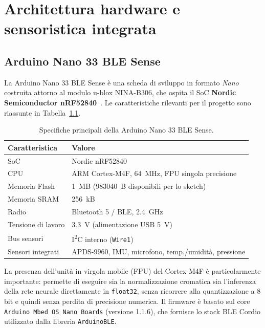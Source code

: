 \documentclass[11pt,a4paper,twoside,openany]{report}
\begin{document}
\chapter{Architettura hardware e sensoristica integrata}
\label{ch:hardware}

\section{Arduino Nano 33 BLE Sense}

La Arduino Nano 33 BLE Sense è una scheda di sviluppo in formato
\textit{Nano} costruita attorno al modulo u-blox NINA-B306, che ospita il
SoC \textbf{Nordic Semiconductor nRF52840}~\cite{nrf52840}. Le
caratteristiche rilevanti per il progetto sono riassunte in
Tabella~\ref{tab:nano33}.

\begin{table}[htbp]
\centering
\caption{Specifiche principali della Arduino Nano 33 BLE Sense.}
\label{tab:nano33}
\begin{tabular}{@{}ll@{}}
\toprule
\textbf{Caratteristica} & \textbf{Valore} \\
\midrule
SoC                     & Nordic nRF52840 \\
CPU                     & ARM Cortex-M4F, \SI{64}{MHz}, FPU singola precisione \\
Memoria Flash           & \SI{1}{MB} (\SI{983040}{B} disponibili per lo sketch) \\
Memoria SRAM            & \SI{256}{kB} \\
Radio                   & Bluetooth 5 / BLE, \SI{2.4}{GHz} \\
Tensione di lavoro      & \SI{3.3}{V} (alimentazione USB \SI{5}{V}) \\
Bus sensori             & I\textsuperscript{2}C interno (\texttt{Wire1}) \\
Sensori integrati       & APDS-9960, IMU, microfono, temp./umidità, pressione \\
\bottomrule
\end{tabular}
\end{table}

La presenza dell'unità in virgola mobile (FPU) del Cortex-M4F è
particolarmente importante: permette di eseguire sia la normalizzazione
cromatica sia l'inferenza della rete neurale direttamente in
\texttt{float32}, senza ricorrere alla quantizzazione a 8 bit e quindi
senza perdita di precisione numerica. Il firmware è basato sul core
\texttt{Arduino Mbed OS Nano Boards} (versione 1.1.6), che fornisce lo
stack BLE Cordio utilizzato dalla libreria \texttt{ArduinoBLE}.
\end{document}
